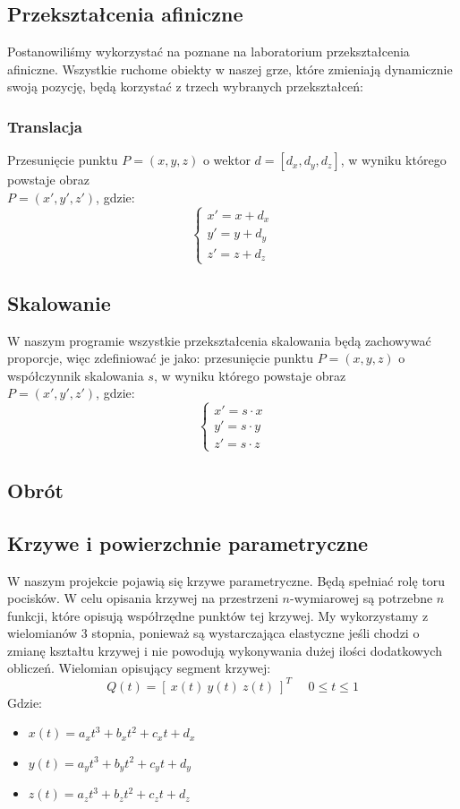 \documentclass[a4paper,twoside]{article}
\begin{document}
		\subsection{Przekształcenia afiniczne}
			Postanowiliśmy wykorzystać na poznane na laboratorium przekształcenia afiniczne. Wszystkie ruchome obiekty w naszej grze, które zmieniają dynamicznie swoją pozycję, będą korzystać z trzech wybranych przekształceń:
			\subsubsection{Translacja}
				Przesunięcie punktu $ P=(x, y, z) $ o wektor $ d=[d_x, d_y, d_z] $, w wyniku którego powstaje obraz\\ $ P=(x', y', z') $, gdzie:
				$$
					\begin{cases}
						x'=x+d_x\\
						y'=y+d_y\\
						z'=z+d_z
					\end{cases}
				$$
			\subsection{Skalowanie}
				W naszym programie wszystkie przekształcenia skalowania będą zachowywać proporcje, więc zdefiniować je jako: przesunięcie punktu $ P=(x, y, z) $ o współczynnik skalowania $ s $, w wyniku którego powstaje obraz\\ $ P=(x', y', z') $, gdzie:
				$$
					\begin{cases}
						x'=s\cdot x\\
						y'=s\cdot y\\
						z'=s\cdot z
					\end{cases}
				$$
			\subsection{Obrót}
			
		\subsection{Krzywe i powierzchnie parametryczne}
			W naszym projekcie pojawią się krzywe parametryczne. Będą spełniać rolę toru pocisków. W celu opisania krzywej na przestrzeni $ n $-wymiarowej są potrzebne $ n $ funkcji, które opisują współrzędne punktów tej krzywej. My wykorzystamy z wielomianów 3 stopnia, ponieważ są wystarczająca elastyczne jeśli chodzi o zmianę kształtu krzywej i nie powodują wykonywania dużej ilości dodatkowych obliczeń.
			Wielomian opisujący segment krzywej:
			$$ Q(t)=[\:x(t)\:y(t)\:z(t)\:]^T  \:\:\:\:\:\: 0 \leq t \leq 1 $$
			Gdzie:
			\begin{itemize}
				\item $ x(t)= a_x t^3+b_x t^2+c_x t+d_x $
				\item $ y(t)= a_y t^3+b_y t^2+c_y t+d_y $
				\item $ z(t)= a_z t^3+b_z t^2+c_z t+d_z $
			\end{itemize}
\end{document}
